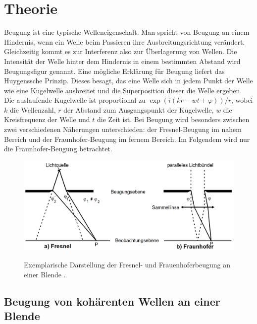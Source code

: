 
\section{Theorie}
\label{sec:Theorie}

Beugung ist eine typische Welleneigenschaft. Man spricht von Beugung an einem Hindernis, wenn ein Welle beim Passieren ihre Ausbreitungsrichtung verändert. Gleichzeitig kommt es zur Interferenz also zur Überlagerung von Wellen. Die Intensität der Welle hinter dem Hindernis in einem bestimmten Abstand wird Beugungsfigur genannt. Eine mögliche Erklärung für Beugung liefert das Huygenssche Prinzip. Dieses besagt, das eine Welle sich in jedem Punkt der Welle wie eine Kugelwelle ausbreitet und die Superposition dieser die Welle ergeben. Die auslaufende Kugelwelle ist proportional zu $\exp(i (k r -w t+\varphi))/r$, wobei $k$ die Wellenzahl, $r$ der Abstand zum Ausgangspunkt der Kugelwelle, $w$ die Kreisfrequenz der Welle und $t$ die Zeit ist. Bei Beugung wird besonders zwischen zwei verschiedenen Näherungen unterschieden: der Fresnel-Beugung im nahem Bereich und der Fraunhofer-Beugung im fernem Bereich. Im Folgendem wird nur die Fraunhofer-Beugung betrachtet.
\begin{figure}
	\centering
	\caption{Exemplarische Darstellung der Fresnel- und Frauenhoferbeugung an einer Blende \cite{V406}.}
	\includegraphics[width=\linewidth-150pt,height=\textheight-150pt,keepaspectratio]{content/images/FresnelFrauenhoferBeugung.png}
	\label{fig:FFB}
\end{figure}

\subsection{Beugung von kohärenten Wellen an einer Blende}

